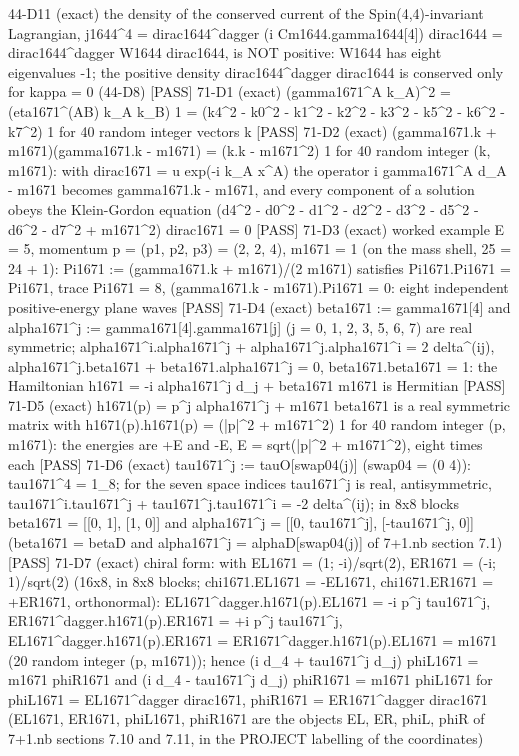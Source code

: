 \documentclass[
  10pt,
]{article}
\newenvironment{Shaded}{}{}
\newcommand{\NormalTok}[1]{#1}
\begin{document}
\begin{Shaded}
\begin{Highlighting}[]
\NormalTok{[PASS] 44{-}D11  (exact) the density of the conserved current of the Spin(4,4){-}invariant Lagrangian, j1644\^{}4 = dirac1644\^{}dagger (i Cm1644.gamma1644[4]) dirac1644 = dirac1644\^{}dagger W1644 dirac1644, is NOT positive: W1644 has eight eigenvalues {-}1; the positive density dirac1644\^{}dagger dirac1644 is conserved only for kappa = 0 (44{-}D8)}
\NormalTok{[PASS] 71{-}D1  (exact) (gamma1671\^{}A k\_A)\^{}2 = (eta1671\^{}(AB) k\_A k\_B) 1 = (k4\^{}2 {-} k0\^{}2 {-} k1\^{}2 {-} k2\^{}2 {-} k3\^{}2 {-} k5\^{}2 {-} k6\^{}2 {-} k7\^{}2) 1 for 40 random integer vectors k}
\NormalTok{[PASS] 71{-}D2  (exact) (gamma1671.k + m1671)(gamma1671.k {-} m1671) = (k.k {-} m1671\^{}2) 1 for 40 random integer (k, m1671): with dirac1671 = u exp({-}i k\_A x\^{}A) the operator i gamma1671\^{}A d\_A {-} m1671 becomes gamma1671.k {-} m1671, and every component of a solution obeys the Klein{-}Gordon equation (d4\^{}2 {-} d0\^{}2 {-} d1\^{}2 {-} d2\^{}2 {-} d3\^{}2 {-} d5\^{}2 {-} d6\^{}2 {-} d7\^{}2 + m1671\^{}2) dirac1671 = 0}
\NormalTok{[PASS] 71{-}D3  (exact) worked example E = 5, momentum p = (p1, p2, p3) = (2, 2, 4), m1671 = 1 (on the mass shell, 25 = 24 + 1): Pi1671 := (gamma1671.k + m1671)/(2 m1671) satisfies Pi1671.Pi1671 = Pi1671, trace Pi1671 = 8, (gamma1671.k {-} m1671).Pi1671 = 0: eight independent positive{-}energy plane waves}
\NormalTok{[PASS] 71{-}D4  (exact) beta1671 := gamma1671[4] and alpha1671\^{}j := gamma1671[4].gamma1671[j] (j = 0, 1, 2, 3, 5, 6, 7) are real symmetric; alpha1671\^{}i.alpha1671\^{}j + alpha1671\^{}j.alpha1671\^{}i = 2 delta\^{}(ij), alpha1671\^{}j.beta1671 + beta1671.alpha1671\^{}j = 0, beta1671.beta1671 = 1: the Hamiltonian h1671 = {-}i alpha1671\^{}j d\_j + beta1671 m1671 is Hermitian}
\NormalTok{[PASS] 71{-}D5  (exact) h1671(p) = p\^{}j alpha1671\^{}j + m1671 beta1671 is a real symmetric matrix with h1671(p).h1671(p) = (|p|\^{}2 + m1671\^{}2) 1 for 40 random integer (p, m1671): the energies are +E and {-}E, E = sqrt(|p|\^{}2 + m1671\^{}2), eight times each}
\NormalTok{[PASS] 71{-}D6  (exact) tau1671\^{}j := tauO[swap04(j)] (swap04 = (0 4)): tau1671\^{}4 = 1\_8; for the seven space indices tau1671\^{}j is real, antisymmetric, tau1671\^{}i.tau1671\^{}j + tau1671\^{}j.tau1671\^{}i = {-}2 delta\^{}(ij); in 8x8 blocks beta1671 = [[0, 1], [1, 0]] and alpha1671\^{}j = [[0, tau1671\^{}j], [{-}tau1671\^{}j, 0]] (beta1671 = betaD and alpha1671\^{}j = alphaD[swap04(j)] of 7+1.nb section 7.1)}
\NormalTok{[PASS] 71{-}D7  (exact) chiral form: with EL1671 = (1; {-}i)/sqrt(2), ER1671 = ({-}i; 1)/sqrt(2) (16x8, in 8x8 blocks; chi1671.EL1671 = {-}EL1671, chi1671.ER1671 = +ER1671, orthonormal): EL1671\^{}dagger.h1671(p).EL1671 = {-}i p\^{}j tau1671\^{}j, ER1671\^{}dagger.h1671(p).ER1671 = +i p\^{}j tau1671\^{}j, EL1671\^{}dagger.h1671(p).ER1671 = ER1671\^{}dagger.h1671(p).EL1671 = m1671 (20 random integer (p, m1671)); hence (i d\_4 + tau1671\^{}j d\_j) phiL1671 = m1671 phiR1671 and (i d\_4 {-} tau1671\^{}j d\_j) phiR1671 = m1671 phiL1671 for phiL1671 = EL1671\^{}dagger dirac1671, phiR1671 = ER1671\^{}dagger dirac1671 (EL1671, ER1671, phiL1671, phiR1671 are the objects EL, ER, phiL, phiR of 7+1.nb sections 7.10 and 7.11, in the PROJECT labelling of the coordinates)}

\end{Highlighting}
\end{Shaded}
\end{document}
